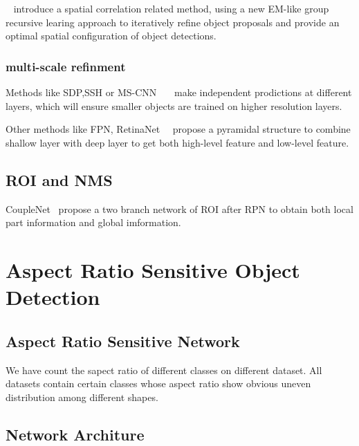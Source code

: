 \documentclass[10pt,twocolumn,letterpaper]{article}
\begin{document}
~\cite{GroupRecursive} introduce a spatial correlation related method, using a new EM-like group recursive learing approach to iteratively refine object proposals and provide an optimal spatial configuration of object detections.
\subsubsection{multi-scale refinment}
Methods like SDP,SSH or MS-CNN ~\cite{SDP}~\cite{SSH}~\cite{MSCNN}make independent prodictions at different layers, which will ensure smaller objects are trained on higher resolution layers.


Other methods like FPN, RetinaNet~\cite{FPN}~\cite{RetinaNet} propose a pyramidal structure to combine shallow layer with deep layer to get both high-level feature and low-level feature.

\subsection{ROI and NMS}
CoupleNet~\cite{CoupleNet} propose a two branch network of ROI after RPN to obtain both local part information and global imformation.



\section{Aspect Ratio Sensitive Object Detection}
\subsection{Aspect Ratio Sensitive Network}
We have count the sapect ratio of different classes on different dataset. All datasets contain certain classes whose aspect ratio show obvious uneven distribution among different shapes. 


\subsection{Network Architure}
\end{document}
